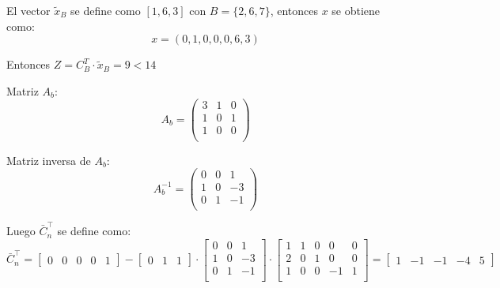 \documentclass{article}
\begin{document}
\begin{flushleft}
		El vector \(\tilde{x}_B\) se define como \([1, 6, 3]\) con \(B = \{2, 6, 7\}\), entonces \(x\) se obtiene como:
		\[
		x = (0, 1, 0, 0, 0, 6, 3)
		\]

		Entonces \( Z = C_B^T \cdot \tilde{x}_B = 9 < 14 \)

		Matriz \( A_b \):
		\[
		A_b = \begin{pmatrix}
		3 & 1 & 0 \\
		1 & 0 & 1 \\
		1 & 0 & 0 \\
		\end{pmatrix}
		\]

		Matriz inversa de \( A_b \):
		\[
		A_b^{-1} = \begin{pmatrix}
		0 & 0 & 1 \\
		1 & 0 & -3 \\
		0 & 1 & -1 \\
		\end{pmatrix}
		\]

		Luego \(\bar{C}_n^\intercal\) se define como:
		\begin{equation*}
			\bar{C}_n^\intercal = 
			\begin{bmatrix}
				0 & 0 & 0 & 0 & 1
			\end{bmatrix} - 
			\begin{bmatrix}
				0 & 1 & 1
			\end{bmatrix} \cdot
			\begin{bmatrix}
				0 & 0 & 1 \\
				1 & 0 & -3 \\
				0 & 1 & -1 \\
			\end{bmatrix} \cdot
			\begin{bmatrix}
				1 & 1 & 0 & 0 & 0  \\
				2 & 0 & 1 &  0 & 0  \\
				1 & 0 & 0 & -1 & 1  \\
			\end{bmatrix} = 
			\begin{bmatrix}
				1 & -1 & -1 & -4 & 5
			\end{bmatrix}
		\end{equation*}
	


\end{flushleft}
\end{document}
